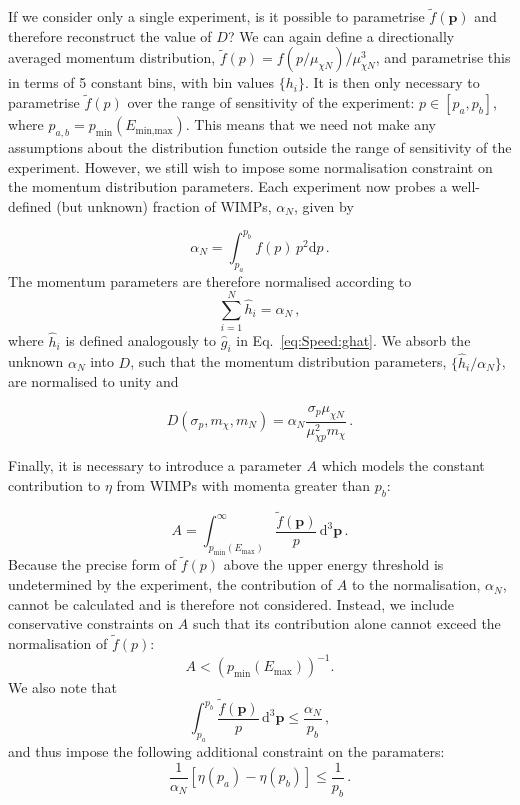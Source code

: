 If we consider only a single experiment, is it possible to parametrise \(\tilde{f}(\mathbf{p})\) and therefore reconstruct the value of $D$? We can again define a directionally averaged momentum distribution, \(\tilde{f}(p) = f(p/\mu_{\chi N})/\mu_{\chi N}^3\), and parametrise this in terms of 5 constant bins, with bin values \(\{h_i\}\). It is then only necessary to parametrise \(\tilde{f}(p)\) over the range of sensitivity of the experiment: \(p \in \left[p_a, p_b\right]\), where \(p_{a,b} = p_\textrm{min}(E_\textrm{min,max})\). This means that we need not make any assumptions about the distribution function outside the range of sensitivity of the experiment. However, we still wish to impose some normalisation constraint on the momentum distribution parameters. Each experiment now probes a well-defined (but unknown) fraction of WIMPs, \(\alpha_N\), given by

\begin{equation}
\alpha_N = \int_{p_a}^{p_b} f(p) \, p^2 \textrm{d}p\,.
\end{equation}
The momentum parameters are therefore normalised according to
\begin{equation}
\sum_{i = 1}^N \hat{h}_i = \alpha_N \,,
\end{equation}
where \(\hat{h}_i\) is defined analogously to \(\hat{g}_i\) in Eq.\ \ref{eq:Speed:ghat}. We absorb the unknown \(\alpha_N\) into \(D\), such that the momentum distribution parameters, \(\{\hat{h}_i/\alpha_N\}\), are normalised to unity and

\begin{equation}
\label{eq:Speed:D}
D(\sigma_p,m_\chi,m_N) = \alpha_N \frac{\sigma_p \mu_{\chi N}}{\mu_{\chi p}^2 m_\chi}\,.
\end{equation}

Finally, it is necessary to introduce a parameter \(A\) which models the constant contribution to \(\eta\) from WIMPs with momenta greater than \(p_b\):

\begin{equation}
A = \int_{p_\textrm{min}(E_\textrm{max})}^\infty \frac{\tilde{f}(\textbf{p})}{p}\, \textrm{d}^3\textbf{p}\,.
\end{equation}
Because the precise form of \(\tilde{f}(p)\) above the upper energy threshold is undetermined by the experiment, the contribution of \(A\) to the normalisation, \(\alpha_N\), cannot be calculated and is therefore not considered. Instead, we include conservative constraints on \(A\) such that its contribution alone cannot exceed the normalisation of \(\tilde{f}(p)\):
\begin{equation}
A < (p_\textrm{min}(E_\textrm{max}))^{-1}.
\end{equation}
We also note that
\begin{equation}
\int_{p_a}^{p_b} \frac{\tilde{f}(\textbf{p})}{p} \, \textrm{d}^3\textbf{p} \leq \frac{\alpha_N}{p_b} \,,
\end{equation}
and thus impose the following additional constraint on the paramaters:
\begin{equation}
\frac{1}{\alpha_N}\left[\eta(p_a) - \eta(p_b)\right] \leq \frac{1}{p_b}\,.
\end{equation}

